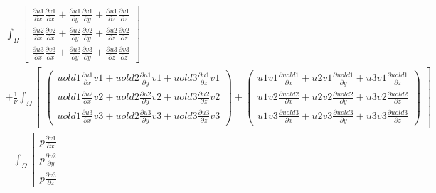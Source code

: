 \documentclass{book}
\begin{document}
\[
\begin{array}{l}
\int_{\Omega}\left[
\begin{array}{c}%
 \frac{\partial u1}{\partial x}\frac{\partial v1}{\partial x}
+\frac{\partial u1}{\partial y}\frac{\partial v1}{\partial y}
+\frac{\partial u1}{\partial z}\frac{\partial v1}{\partial z} \\
 \frac{\partial u2}{\partial x}\frac{\partial v2}{\partial x}
+\frac{\partial u2}{\partial y}\frac{\partial v2}{\partial y}
+\frac{\partial u2}{\partial z}\frac{\partial v2}{\partial z} \\
 \frac{\partial u3}{\partial x}\frac{\partial v3}{\partial x}
+\frac{\partial u3}{\partial y}\frac{\partial v3}{\partial y}
+\frac{\partial u3}{\partial z}\frac{\partial v3}{\partial z} 
\end{array} \right] \\
+\frac{1}{\nu}\int_{\Omega}\left[
\begin{array}{c}
\left(\begin{array}{c}%
uold1 \frac{\partial u1}{\partial x} v1  +
uold2 \frac{\partial u1}{\partial y} v1  +
uold3 \frac{\partial u1}{\partial z} v1  \\
uold1 \frac{\partial u2}{\partial x} v2  +
uold2 \frac{\partial u2}{\partial y} v2  +
uold3 \frac{\partial u2}{\partial z} v2  \\
uold1 \frac{\partial u3}{\partial x} v3  +
uold2 \frac{\partial u3}{\partial y} v3  +
uold3 \frac{\partial u3}{\partial z} v3  
\end{array}\right)
+
\left(\begin{array}{c}%
u1v1 \frac{\partial uold1}{\partial x}  +
u2v1 \frac{\partial uold1}{\partial y}  +
u3v1 \frac{\partial uold1}{\partial z}  \\
u1v2 \frac{\partial uold2}{\partial x}  +
u2v2 \frac{\partial uold2}{\partial y}  +
u3v2 \frac{\partial uold2}{\partial z}  \\
u1v3 \frac{\partial uold3}{\partial x}  +
u2v3 \frac{\partial uold3}{\partial y}  +
u3v3 \frac{\partial uold3}{\partial z}   
\end{array}\right)
\end{array} \right] \\
-\int_{\Omega}\left[
\begin{array}{c}%
p\frac{\partial v1}{\partial x} \\
p\frac{\partial v2}{\partial y} \\
p\frac{\partial v3}{\partial z} 

\end{array}
\end{array}\]
\end{document}
